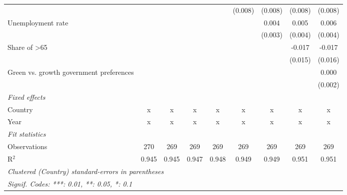 \begin{table}[htbp]
\begin{tabular}{lcccccccc}
                                                                               &         &         &         &         & (0.008) & (0.008) & (0.008) & (0.008)\\   
      Unemployment rate                                                        &         &         &         &         &         & 0.004   & 0.005   & 0.006\\   
                                                                               &         &         &         &         &         & (0.003) & (0.004) & (0.004)\\   
      Share of >65                                                             &         &         &         &         &         &         & -0.017  & -0.017\\   
                                                                               &         &         &         &         &         &         & (0.015) & (0.016)\\   
      Green vs. growth government preferences                                  &         &         &         &         &         &         &         & 0.000\\   
                                                                               &         &         &         &         &         &         &         & (0.002)\\   
      \emph{Fixed effects}\\
      Country                                                                  & x       & x       & x       & x       & x       & x       & x       & x\\  
      Year                                                                     & x       & x       & x       & x       & x       & x       & x       & x\\  
      \midrule \emph{Fit statistics}\\
      Observations                                                             & 270     & 269     & 269     & 269     & 269     & 269     & 269     & 269\\  
      R$^2$                                                                    & 0.945   & 0.945   & 0.947   & 0.948   & 0.949   & 0.949   & 0.951   & 0.951\\  
      \midrule
      \multicolumn{9}{l}{\emph{Clustered (Country) standard-errors in parentheses}}\\
      \multicolumn{9}{l}{\emph{Signif. Codes: ***: 0.01, **: 0.05, *: 0.1}}\\
   \end{tabular}
\end{table}


